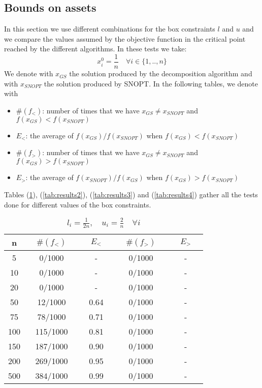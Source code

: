 \subsection{Bounds on assets}\label{bounded}
In this section we use different combinations for the box constraints $l$ and $u$ and we compare the values assumed by the objective function in the critical point reached by the different algorithms. In these tests we take:
\begin{equation}
x_i^0 = \frac{1}{n} \quad \forall i \in \{1, .., n \}
\end{equation}
We denote with $x_{GS}$ the solution produced by the decomposition algorithm and with $x_{SNOPT}$ the solution produced by SNOPT. In the following tables, we denote with
\begin{itemize}
\item $\#(f_{<})$: number of times that we have $x_{GS} \neq x_{SNOPT}$ and $f(x_{GS}) < f(x_{SNOPT})$
\item $E_{<}$: the average of $f(x_{GS})/f(x_{SNOPT})$ when $f(x_{GS}) < f(x_{SNOPT})$
\item $\#(f_{>})$: number of times that we have $x_{GS} \neq x_{SNOPT}$ and $f(x_{GS}) > f(x_{SNOPT})$
\item $E_{>}$: the average of $f(x_{SNOPT})/f(x_{GS})$ when $f(x_{GS}) > f(x_{SNOPT})$
\end{itemize}
Tables (\ref{tab:results1}), (\ref{tab:results2}), (\ref{tab:results3}) and (\ref{tab:results4}) gather all the tests done for different values of the box constraints.

\begin{table}
\begin{center}
\begin{tabular}{ c | c | c | c | c}
n &  $\quad \#(f_<) \quad$ & $\quad E_< \quad$ &  $\quad \#(f_>) \quad$ & $ \quad E_> \quad$  \\\hline
5 & 0/1000     & - & 0/1000 & -     \\\hline
10 & 0/1000    & -   & 0/1000 & -        \\\hline
20 & 0/1000    & -   & 0/1000 & -        \\\hline
50 & 12/1000   & 0.64 & 0/1000 & -       \\\hline
75 & 78/1000  & 0.71  & 0/1000 & -      \\\hline
100 & 115/1000 & 0.81  & 0/1000 & -      \\\hline
150 & 187/1000 & 0.90 & 0/1000 & -       \\\hline
200 & 269/1000 & 0.95 & 0/1000 & -       \\\hline
500 & 384/1000 & 0.99 & 0/1000 & -     \\\hline
\end{tabular}
\caption{$l_i = \frac{1}{2n}, \quad u_i = \frac{2}{n} \quad \forall i$}
\label{tab:results1}
\end{center}
\end{table}

